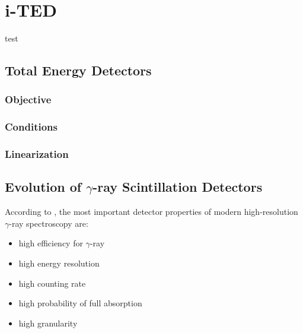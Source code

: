 \chapter{i-TED}\label{ch:detector}

test

\section{Total Energy Detectors}

\subsection{Objective}

\subsection{Conditions}

\subsection{Linearization}

\section{Evolution of $\gamma$-ray Scintillation Detectors}

According to \cite[p.~253]{Stock2013Sep}, the most important detector properties of modern high-resolution $\gamma$-ray spectroscopy are:
\begin{itemize}\label{list:hires_spec}
    \item high efficiency for $\gamma$-ray
    \item high energy resolution
    \item high counting rate
    \item high probability of full absorption
    \item high granularity
\end{itemize}

